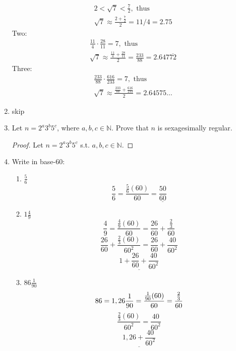 \documentclass[12pt]{article}
\begin{document}
\begin{enumerate}
\begin{tasks}
\begin{gather*}
                2 < \sqrt{7} < \frac{7}{2}, \text{ thus} \\
                \sqrt{7} \approx \frac{2+\frac{7}{2}}{2}=11/4=2.75
            \end{gather*}
            Two:
            \begin{gather*}
                \frac{11}{4}\cdot\frac{28}{11}=7, \text{ thus} \\
                \sqrt{7} \approx \frac{\frac{11}{4}+\frac{28}{11}}{2}=\frac{233}{88}=2.647\overline{72}
            \end{gather*}
            Three: 
            \begin{gather*}
                \frac{233}{88}\cdot\frac{616}{233}=7, \text{ thus} \\
                \sqrt{7} \approx \frac{\frac{233}{88}+\frac{616}{233}}{2}=2.64575\dots
            \end{gather*}
        \end{tasks}
        \item skip
        \item Let $n=2^a3^b5^c$, where $a,b,c\in \mathbb{N}$. Prove that $n$ is sexagesimally regular.
        \begin{proof}
            Let $n=2^a3^b5^c$ s.t. $a,b,c\in\mathbb{N}$.
        \end{proof}
        \item Write in base-60:
        \begin{enumerate}
            \item $\frac{5}{6}$
            \[
              \frac{5}{6}=\frac{\frac{5}{6}(60)}{60} = \underline{\frac{50}{60}}
            \]
            \item $1\frac{4}{9}$
            \[
                \frac{4}{9} = \frac{\frac{4}{9}(60)}{60}=\frac{26}{60}+\frac{\frac{2}{3}}{60}\]
                \[\frac{26}{60}+\frac{\frac{2}{3}(60)}{60^2}=\frac{26}{60}+\frac{40}{60^2}
                \]
                \[\underline{1+\frac{26}{60}+\frac{40}{60^2}}\]
            \item $86\frac{1}{90}$
            \[
                86=1,26 \\
                \frac{1}{90}=\frac{\frac{1}{90}(60)}{60}=\frac{\frac{2}{3}}{60} \\
            \]
            \[\frac{\frac{2}{3}(60)}{60^2}=\frac{40}{60^2}\]
            \[\underline{1,26+\frac{40}{60^2}}\]
        \end{enumerate}
\end{enumerate}
\end{document}
